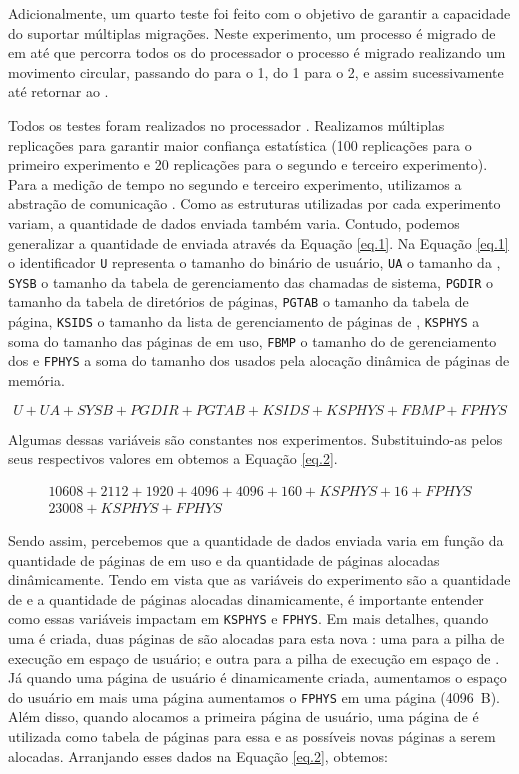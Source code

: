 Adicionalmente, um quarto teste foi feito com o objetivo de garantir a capacidade do \daemon suportar múltiplas migrações. Neste experimento, um processo é migrado de \cluster em \cluster até que percorra todos os \clusters do processador \ie o processo é migrado realizando um movimento circular, passando do  para o 1, do 1 para o 2, e assim sucessivamente até retornar ao .

Todos os testes foram realizados no processador \mppa. Realizamos múltiplas replicações para garantir maior confiança estatística (100 replicações para o primeiro experimento e 20 replicações para o segundo e terceiro experimento). Para a medição de tempo no segundo e terceiro experimento, utilizamos a abstração de comunicação \sync. Como as estruturas utilizadas por cada experimento variam, a quantidade de dados enviada também varia. Contudo, podemos generalizar a quantidade de \bytes enviada através da Equação \ref{eq.1}. Na Equação \ref{eq.1} o identificador \texttt{U} representa o tamanho do binário de usuário, \texttt{UA} o tamanho da \uarea, \texttt{SYSB} o tamanho da tabela de gerenciamento das chamadas de sistema, \texttt{PGDIR} o tamanho da tabela de diretórios de páginas, \texttt{PGTAB} o tamanho da tabela de página, \texttt{KSIDS} o tamanho da lista de gerenciamento de páginas de , \texttt{KSPHYS} a soma do tamanho das páginas de  em uso, \texttt{FBMP} o tamanho do \bitmap de gerenciamento dos \frames e \texttt{FPHYS} a soma do tamanho dos \frames usados pela alocação dinâmica de páginas de memória.

\begin{equation}\label{eq.1}
    U + UA + SYSB + PGDIR + PGTAB + KSIDS + KSPHYS + FBMP + FPHYS
\end{equation}

Algumas dessas variáveis são constantes nos experimentos. Substituindo-as pelos seus respectivos valores em \bytes obtemos a Equação \ref{eq.2}.

\begin{gather}
    10608 + 2112 + 1920 + 4096 + 4096 + 160 + KSPHYS + 16 + FPHYS\\
    23008 + KSPHYS + FPHYS\label{eq.2}
\end{gather}

Sendo assim, percebemos que a quantidade de dados enviada varia em função da quantidade de páginas de  em uso e da quantidade de páginas alocadas dinâmicamente. Tendo em vista que as variáveis do experimento são a quantidade de \threads e a quantidade de páginas alocadas dinamicamente, é importante entender como essas variáveis impactam em \texttt{KSPHYS} e \texttt{FPHYS}. Em mais detalhes, quando uma \thread é criada, duas páginas de  são alocadas para esta nova \thread: uma para a pilha de execução em espaço de usuário; e outra para a pilha de execução em espaço de . Já quando uma página de usuário é dinamicamente criada, aumentamos o espaço do usuário em mais uma página \ie aumentamos o \texttt{FPHYS} em uma página (4096~B). Além disso, quando alocamos a primeira página de usuário, uma página de  é utilizada como tabela de páginas para essa e as possíveis novas páginas a serem alocadas. Arranjando esses dados na Equação \ref{eq.2}, obtemos:

